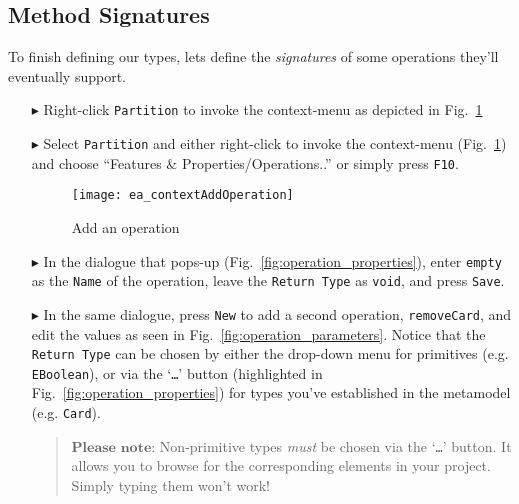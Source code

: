 \newpage
\subsection{Method Signatures}
\visHeader
\hypertarget{static:methods vis}{}

To finish defining our types, lets define the \emph{signatures} of some operations they'll eventually support.

\begin{enumerate}
  
\item[$\blacktriangleright$] Right-click \texttt{Partition} to invoke the context-menu as depicted in Fig.~\ref{fig:add_operation}

\item[$\blacktriangleright$] Select \texttt{Partition} and either right-click to invoke the context-menu (Fig.~\ref{fig:add_operation})  and choose ``Features \&
Properties/Operations..'' or simply press \texttt{F10}.

\begin{figure}[htbp]
	\centering
  \texttt{[image: ea\_contextAddOperation]}
	\caption{Add an operation}
	\label{fig:add_operation}
\end{figure}
\FloatBarrier

\item[$\blacktriangleright$] In the dialogue that pops-up (Fig.~\ref{fig:operation_properties}), enter \texttt{empty} as the \texttt{Name} of the operation,
leave the \texttt{Return Type} as \texttt{void}, and press \texttt{Save}. 

\vspace{0.5cm}

\item[$\blacktriangleright$] In the same dialogue, press \texttt{New} to add a second operation, \texttt{removeCard}, and edit the values as seen in 
Fig.~\ref{fig:operation_parameters}. Notice that the \texttt{Return Type} can be chosen by either the drop-down menu for
primitives (e.g. \texttt{EBoolean}), or via the `\texttt{\ldots}' button (highlighted in Fig.~\ref{fig:operation_properties}) for types you've established in
the metamodel (e.g. \texttt{Card}).
\vspace{-.3cm}
\begin{quote}
{ \small
$\textbf{Please note:}$ Non-primitive types \emph{must} be chosen via the `\texttt{\ldots}' button. It allows you to browse for the corresponding elements in
your project. Simply typing them won't work!
}
\end{quote}


\end{enumerate}
